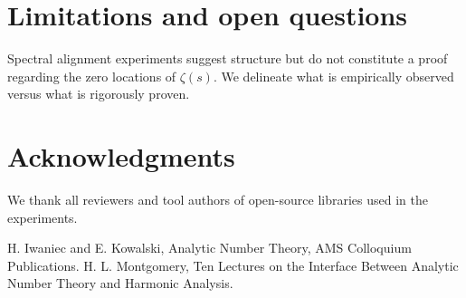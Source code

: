 \documentclass[11pt]{article}
\theoremstyle{definition}
\theoremstyle{remark}
\begin{document}
\section{Limitations and open questions}
Spectral alignment experiments suggest structure but do not constitute a proof regarding the zero locations of \(\zeta(s)\). We delineate what is empirically observed versus what is rigorously proven.

\section*{Acknowledgments}
We thank all reviewers and tool authors of open-source libraries used in the experiments.


\begin{thebibliography}{9}
 H. Iwaniec and E. Kowalski, Analytic Number Theory, AMS Colloquium Publications.
 H. L. Montgomery, Ten Lectures on the Interface Between Analytic Number Theory and Harmonic Analysis.
\end{thebibliography}
\end{document}

